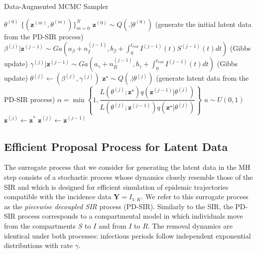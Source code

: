 \documentclass[12pt]{article}
\begin{document}
	\begin{algorithm}
		\caption{Data-Augmented MCMC Sampler}
		\label{alg:DA-MCMC}
		\begin{algorithmic}
			\REQUIRE $\theta^{(0)}$
			\RETURN $\{(\mathbf{z}^{(m)}, \theta^{(m)})\}_{m=0}^N$ 
			\STATE $\mathbf{z}^{(0)} \sim Q(.|\theta^{(0)})$ (generate the initial latent data from the PD-SIR process)
			\STATE $\beta^{(j)}|\mathbf{z}^{(j - 1)} \sim Ga\left( a_{\beta} + n_I^{(j - 1)}, b_{\beta} + \int_{0}^{t_{end}} I^{(j - 1)}(t)S^{(j - 1)}(t)dt\right)$ (Gibbs update)
			\STATE $\gamma^{(j)}|\mathbf{z}^{(j-1)} \sim Ga\left( a_{\gamma} + n_R^{(j - 1)}, b_{\gamma} + \int_{0}^{t_{end}} I^{(j - 1)}(t) dt\right)$ (Gibbs update)
			\STATE $\theta^{(j)} \leftarrow (\beta^{(j)}, \gamma^{(j)})$
			\STATE $\mathbf{z}^\star \sim Q(.|\theta^{(j)})$ (generate latent data from the PD-SIR process)
			\STATE $\alpha = \min\left\lbrace 1, \dfrac{L(\theta^{(j)}; \mathbf{z}^\star)q(\mathbf{z}^{(j - 1)}|\theta^{(j)})}{L(\theta^{(j)}; \mathbf{z}^{(j - 1)})q(\mathbf{z}^\star|\theta^{(j)})}\right\rbrace  $
			\STATE $u \sim U(0,1)$
			\STATE $\mathbf{z}^{(j)} \leftarrow \mathbf{z}^*$			
			\ELSE
			\STATE $\mathbf{z}^{(j)} \leftarrow \mathbf{z}^{(j - 1)}$
			\ENDIF
			\ENDFOR
		\end{algorithmic}
	\end{algorithm}
	
	
	\subsection{Efficient Proposal Process for Latent Data}
	\label{sec:pds}
	
	The surrogate process that we consider for generating the latent data in the MH step consists of a stochastic process whose dynamics closely resemble those of the SIR and which is designed for efficient simulation of epidemic trajectories compatible with the incidence data $\mathbf{Y} = I_{1:K}$. We refer to this surrogate process as the \textit{piecewise decoupled SIR} process (PD-SIR).
	Similarly to the SIR, the PD-SIR process corresponds to a compartmental model in which individuals move from the compartments $S$ to $I$ and from $I$ to $R$.
	The removal dynamics are identical under both processes: infectious periods follow independent exponential distributions with rate $\gamma$.
	
\end{document}
